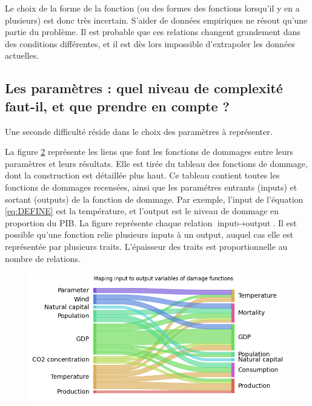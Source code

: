 Le choix de la forme de la fonction (ou des formes des fonctions lorsqu'il y en a plusieurs) est donc très incertain. S'aider de données empiriques ne résout qu'une partie du problème. Il est probable que ces relations changent grandement dans des conditions différentes, et il est dès lors impossible d'extrapoler les données actuelles. 

\subsection{Les paramètres : quel niveau de complexité faut-il, et que prendre en compte ?}

Une seconde difficulté réside dans le choix des paramètres à représenter. 

La figure \ref{fig:sankey} représente les liens que font les fonctions de dommages entre leurs paramètres et leurs résultats. Elle est tirée du tableau des fonctions de dommage, dont la construction est détaillée plus haut. Ce tableau contient toutes les fonctions de dommages recensées, ainsi que les paramétres entrants (inputs) et sortant (outputs) de la fonction de dommage. Par exemple, l'input de l'équation \ref{eq:DEFINE} est la température, et l'output est le niveau de dommage en proportion du PIB. La figure représente chaque relation $ \text{input} \mapsto \text{output} $. Il est possible qu'une fonction relie plusieurs inputs à un output, auquel cas elle est représentée par plusieurs traits. L'épaisseur des traits est proportionnelle au nombre de relations.


\begin{figure}
    \label{fig:ACP}
\end{figure}


\begin{figure}
    \centering
    \includegraphics[width=0.9\linewidth]{figures/sankey.png}
    \label{fig:sankey}
\end{figure}

